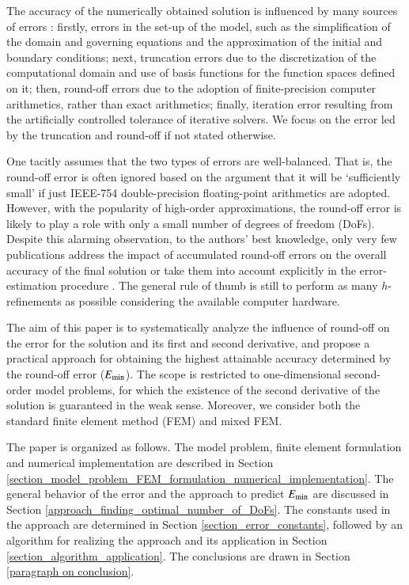 \documentclass[review,3p]{elsarticle}
\begin{document}
The accuracy of the numerically obtained solution is influenced by many sources of errors \cite{ferziger2012computational}: firstly, errors in the set-up of the model, such as the simplification of the domain and governing equations and the approximation of the initial and boundary conditions; next, truncation errors due to the discretization of the computational domain and use of basis functions for the function spaces defined on it; then, round-off errors due to the adoption of finite-precision computer arithmetics, rather than exact arithmetics; finally, iteration error resulting from the artificially controlled tolerance of iterative solvers. We focus on the error led by the truncation and round-off if not stated otherwise.

One tacitly assumes that the two types of errors are well-balanced. That is, the round-off error is often ignored based on the argument that it will be `sufficiently small' if just IEEE-754 double-precision floating-point arithmetics are adopted.
However, with the popularity of high-order approximations, the round-off error is likely to play a role with only a small number of degrees of freedom (DoFs). Despite this alarming observation, to the authors’ best knowledge, only very few publications address the impact of accumulated round-off errors on the overall accuracy of the final solution or take them into account explicitly in the error-estimation procedure {\cite{ling1984numerical,mou2017example,ainsworth1992procedure,alvarez2012round}}.
The general rule of thumb is still to perform as many $h$-refinements as possible considering the available computer hardware.

The aim of this paper is to systematically analyze the influence of round-off on the error for the solution and its first and second derivative, and propose a practical approach for obtaining the highest attainable accuracy determined by the round-off error (${E}_{\rm {min}}$).
The scope is restricted to one-dimensional second-order model problems, for which the existence of the second derivative of the solution is guaranteed in the weak sense. Moreover, we consider both the standard finite element method (FEM) and mixed FEM\cite{boffi2013mixed}.

The paper is organized as follows. The model problem, finite element formulation and numerical implementation are described in Section \ref{section_model_problem_FEM_formulation_numerical_implementation}. The general behavior of the error and the approach to predict ${E}_{\rm {min}}$ are discussed in Section \ref{approach_finding_optimal_number_of_DoFs}. The constants used in the approach are determined in Section \ref{section_error_constants}, followed by an algorithm for realizing the approach and its application in Section \ref{section_algorithm_application}. The conclusions are drawn in Section \ref{paragraph on conclusion}.
\end{document}
